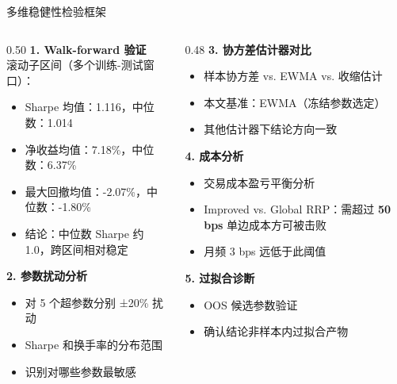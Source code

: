 \documentclass[aspectratio=169,11pt]{beamer}
\newcommand{\walkforwardSharpeMean}{1.116}
\newcommand{\walkforwardSharpeMedian}{1.014}
\newcommand{\walkforwardNetreturnMean}{7.18\%}
\newcommand{\walkforwardNetreturnMedian}{6.37\%}
\newcommand{\walkforwardMaxddMean}{-2.07\%}
\newcommand{\walkforwardMaxddMedian}{-1.80\%}
\begin{document}
\begin{frame}{多维稳健性检验框架}
  \begin{columns}[T]
    \begin{column}{0.50\textwidth}
      \textbf{1. Walk-forward 验证}\\[0.3em]
      滚动子区间（多个训练-测试窗口）：
      \begin{itemize}
        \item Sharpe 均值：\walkforwardSharpeMean{}，中位数：\walkforwardSharpeMedian
        \item 净收益均值：\walkforwardNetreturnMean{}，中位数：\walkforwardNetreturnMedian
        \item 最大回撤均值：\walkforwardMaxddMean{}，中位数：\walkforwardMaxddMedian
        \item 结论：中位数 Sharpe 约 1.0，跨区间相对稳定
      \end{itemize}
      \vspace{0.4em}
      \textbf{2. 参数扰动分析}
      \begin{itemize}
        \item 对 5 个超参数分别 ±20\% 扰动
        \item Sharpe 和换手率的分布范围
        \item 识别对哪些参数最敏感
      \end{itemize}
    \end{column}
    \begin{column}{0.48\textwidth}
      \textbf{3. 协方差估计器对比}
      \begin{itemize}
        \item 样本协方差 vs. EWMA vs. 收缩估计
        \item 本文基准：EWMA（冻结参数选定）
        \item 其他估计器下结论方向一致
      \end{itemize}
      \vspace{0.4em}
      \textbf{4. 成本分析}
      \begin{itemize}
        \item 交易成本盈亏平衡分析
        \item Improved vs. Global RRP：需超过 \textbf{50 bps} 单边成本方可被击败
        \item 月频 3 bps 远低于此阈值
      \end{itemize}
      \vspace{0.4em}
      \textbf{5. 过拟合诊断}
      \begin{itemize}
        \item OOS 候选参数验证
        \item 确认结论非样本内过拟合产物
      \end{itemize}
    \end{column}
  \end{columns}
\end{frame}
\end{document}
